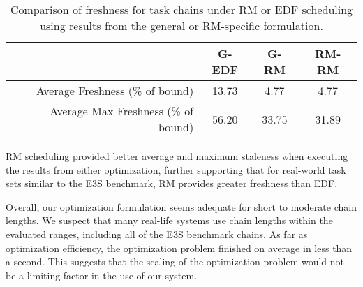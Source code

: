 \begin{table}[h]
	\caption{Comparison of freshness for task chains under RM or EDF scheduling using results from the general or RM-specific formulation.}
	\label{table:freshess_e3s}
	\begin{center}
		\begin{tabular}{|r|c|c|c|}
			\hline
			& G-EDF & G-RM & RM-RM \\
			\hline
			Average Freshness (\% of bound) & 13.73 & 4.77 & 4.77 \\
			Average Max Freshness (\% of bound) & 56.20 & 33.75 & 31.89 \\
			\hline
		\end{tabular}
	\end{center}
\end{table}

RM scheduling provided better average and maximum staleness when executing the results from either optimization, further supporting that for real-world task sets similar to the E3S benchmark, RM provides greater freshness than EDF.

Overall, our optimization formulation seems adequate for short to moderate chain lengths. We suspect that many real-life systems use chain lengths within the evaluated ranges, including all of the E3S benchmark chains. As far as optimization efficiency, the optimization problem finished on average in less than a second. This suggests that the scaling of the optimization problem would not be a limiting factor in the use of our system.
